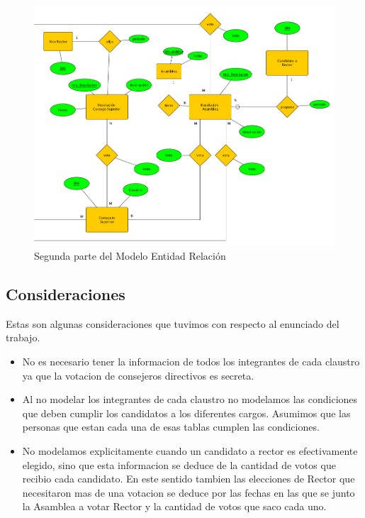 \begin{figure}[h!]
  \centering
  \includegraphics[width=1\textwidth]{./images/der2}
  \caption{Segunda parte del Modelo Entidad Relación}
  \label{fig:clases4}
\end{figure}
\newpage
\subsection{Consideraciones}
Estas son algunas consideraciones que tuvimos con respecto al enunciado del trabajo.

\begin{itemize}
\item  No es necesario tener la informacion de todos los integrantes de cada claustro ya que la votacion de consejeros directivos es secreta.
\item Al no modelar los integrantes de cada claustro no modelamos las condiciones que deben cumplir los candidatos a los diferentes cargos. Asumimos que las personas que estan cada una de esas tablas cumplen las condiciones.
\item No modelamos explicitamente cuando un candidato a rector es efectivamente elegido, sino que esta informacion se deduce de la cantidad de votos que recibio cada candidato. En este sentido tambien las elecciones de Rector que necesitaron mas de una votacion se deduce por las fechas en las que se junto la Asamblea a votar Rector y la cantidad de votos que saco cada uno.

\end{itemize}



